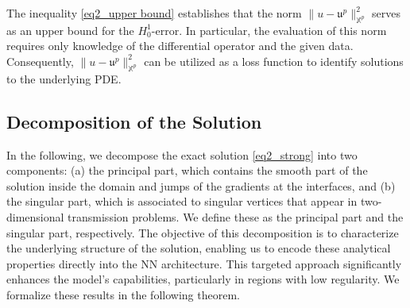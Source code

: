 \documentclass[oneside]{article}
\begin{document}
The inequality \eqref{eq2_upper bound} establishes that the norm $\|u-\mathfrak{u}^p\|_{\mathbb{X}^p}^2$ serves as an upper bound for the $H^1_0$-error. In particular, the evaluation of this norm requires only knowledge of the differential operator and the given data. Consequently, $\|u-\mathfrak{u}^p\|_{\mathbb{X}^p}^2$ can be utilized as a loss function to identify solutions to the underlying PDE.




\subsection{Decomposition of the Solution}\label{Decomposition of the solution}


In the following, we decompose the exact solution \eqref{eq2_strong} into two components: (a) the principal part, which contains the smooth part of the solution inside the domain and jumps of the gradients at the interfaces, and (b) the singular part, which is associated to singular vertices that appear in two-dimensional transmission problems. We define these as the principal part and the singular part, respectively. The objective of this decomposition is to characterize the underlying structure of the solution, enabling us to encode these analytical properties directly into the NN architecture. This targeted approach significantly enhances the model's capabilities, particularly in regions with low regularity. We formalize these results in the following theorem.
\end{document}

